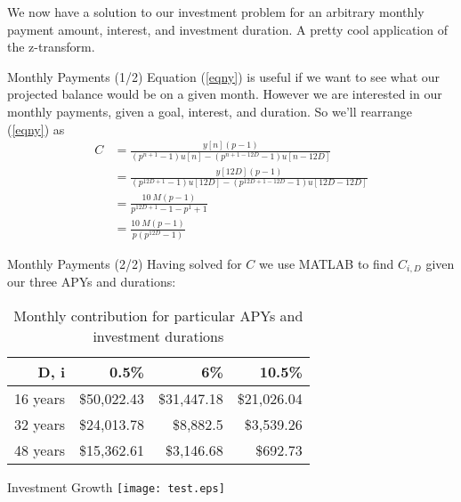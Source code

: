 \documentclass[
    orient=landscape,
    style=sailor
]{powerdot}
\begin{document}
\begin{note}
	We now have a solution to our investment problem for an arbitrary monthly payment amount, interest, and investment duration. A pretty cool application of the z-transform. 
\end{note}

\begin{slide}{Monthly Payments (1/2)}
	Equation (\ref{eqny}) is useful if we want to see what our projected balance would be on a given month. However we are interested in our monthly payments, given a goal, interest, and duration. So we'll rearrange (\ref{eqny}) as
	\begin{align}
	C &= \frac{y[n](p - 1)}{\left(p^{n+1} - 1 \right)u[n] - \left(p^{n+1-12D} - 1 			\right)u[n-12D]} \\
	&= \frac{y[12D](p - 1)}{\left(p^{12D+1} - 1 \right)u[12D] - \left(p^{12D+1-12D} - 1 \right)u[12D-12D]} \\
	&= \frac{\SI{10}{M}(p - 1)}{p^{12D+1} - 1 - p^1 + 1} \\
	&= \frac{\SI{10}{M}(p - 1)}{p\left(p^{12D} - 1\right)}
	\end{align}
\end{slide}
	
\begin{slide}{Monthly Payments (2/2)}
	Having solved for $C$ we use MATLAB to find $C_{i,D}$ given our three APYs and durations:
	\begin{table}[h]
		\centering
		\begin{tabular}{|r|r|r|r|}
			\hline 
			D, i & 0.5\% & 6\% & 10.5\% \\ 
			\hline 
			16 years & \$50,022.43 & \$31,447.18 & \$21,026.04 \\ 
			\hline 
			32 years & \$24,013.78 & \$8,882.5 & \$3,539.26 \\ 
			\hline 
			48 years & \$15,362.61 & \$3,146.68 & \$692.73 \\ 
			\hline 
		\end{tabular} 
		\caption[Table 1:]{Monthly contribution for particular APYs and investment durations}
	\end{table}
\end{slide}

\begin{slide}{Investment Growth}
	\texttt{[image: test.eps]}
\end{slide}
\end{document}
